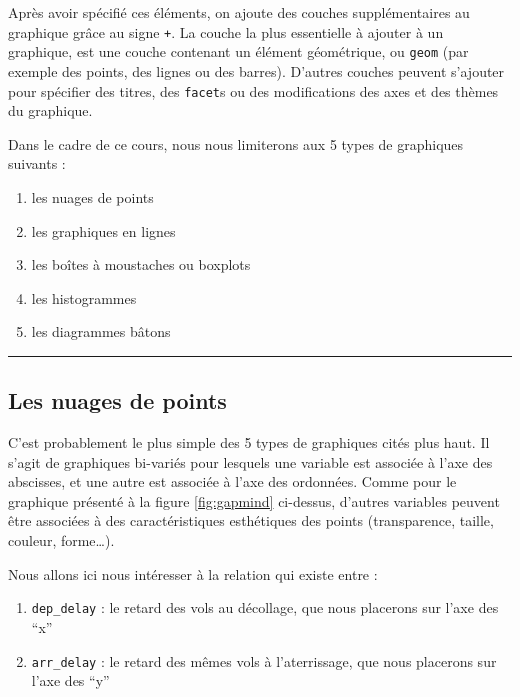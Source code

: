 \documentclass[a4paperpaper,]{article}
\providecommand{\tightlist}{%
  \setlength{\itemsep}{0pt}\setlength{\parskip}{0pt}}
\theoremstyle{definition}
\theoremstyle{definition}
\theoremstyle{definition}
\theoremstyle{remark}
\begin{document}
Après avoir spécifié ces éléments, on ajoute des couches supplémentaires
au graphique grâce au signe \texttt{+}. La couche la plus essentielle à
ajouter à un graphique, est une couche contenant un élément géométrique,
ou \texttt{geom} (par exemple des points, des lignes ou des barres).
D'autres couches peuvent s'ajouter pour spécifier des titres, des
\texttt{facet}s ou des modifications des axes et des thèmes du
graphique.

Dans le cadre de ce cours, nous nous limiterons aux 5 types de
graphiques suivants :

\begin{enumerate}
\def\labelenumi{\arabic{enumi}.}
\tightlist
\item
  les nuages de points
\item
  les graphiques en lignes
\item
  les boîtes à moustaches ou boxplots
\item
  les histogrammes
\item
  les diagrammes bâtons
\end{enumerate}

\begin{center}\rule{0.5\linewidth}{\linethickness}\end{center}

\hypertarget{clouds}{%
\subsection{Les nuages de points}\label{clouds}}

C'est probablement le plus simple des 5 types de graphiques cités plus
haut. Il s'agit de graphiques bi-variés pour lesquels une variable est
associée à l'axe des abscisses, et une autre est associée à l'axe des
ordonnées. Comme pour le graphique présenté à la figure
\ref{fig:gapmind} ci-dessus, d'autres variables peuvent être associées à
des caractéristiques esthétiques des points (transparence, taille,
couleur, forme\ldots{}).

Nous allons ici nous intéresser à la relation qui existe entre :

\begin{enumerate}
\def\labelenumi{\arabic{enumi}.}
\tightlist
\item
  \texttt{dep\_delay} : le retard des vols au décollage, que nous
  placerons sur l'axe des ``x''
\item
  \texttt{arr\_delay} : le retard des mêmes vols à l'aterrissage, que
  nous placerons sur l'axe des ``y''
\end{enumerate}
\end{document}
